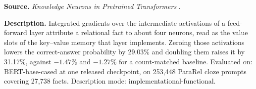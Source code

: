
\textbf{Source.} \emph{Knowledge Neurons in Pretrained Transformers} \citep{dai2022knowledge}.

\textbf{Description.} Integrated gradients over the intermediate activations of a feed-forward layer attribute a relational fact to about four neurons, read as the value slots of the key--value memory that layer implements. Zeroing those activations lowers the correct-answer probability by 29.03\% and doubling them raises it by 31.17\%, against $-1.47\%$ and $-1.27\%$ for a count-matched baseline. Evaluated on: BERT-base-cased at one released checkpoint, on 253,448 ParaRel cloze prompts covering 27,738 facts. Description mode: implementational-functional.

\vspace{4pt}
